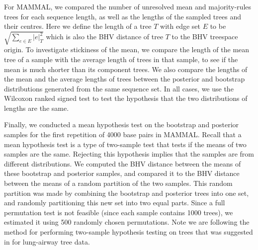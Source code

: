 \documentclass[12pt,letterpaper]{article}
\theoremstyle{plain}
\theoremstyle{definition}
\begin{document}
For MAMMAL, we compared the number of unresolved mean and majority-rules trees for each sequence length, as well as the lengths of the sampled trees and their centres.  Here we define the length of a tree $T$ with edge set $E$ to be $\sqrt{\sum_{e \in E} |e|_T^2}$ which is also the BHV distance of tree $T$ to the BHV treespace origin.  To investigate stickiness of the mean, we compare
the length of the mean tree of a sample with the average length of trees in that sample, to see if the mean is much shorter than its component trees.  We also compare the lengths of the mean and the average lengths of trees between the posterior and bootstrap distributions generated from the same sequence set.  In all cases, we use the Wilcoxon ranked signed test \citep{WilcoxonSignedRankTest} to test the hypothesis that the two distributions of lengths are the same.

Finally, we conducted a mean hypothesis test on the bootstrap and posterior samples for the first repetition of 4000 base pairs in MAMMAL.  Recall that a mean hypothesis test is a type of two-sample test that tests if the means of two samples are the same.  Rejecting this hypothesis implies that the samples are from different distributions.  We computed the BHV distance between the means of these bootstrap and posterior samples, and compared it to the BHV distance between the means of a random partition of the two samples.  This random partition was made by combining the bootstrap and posterior trees into one set, and randomly partitioning this new set into two equal parts.
Since a full permutation test is not feasible (since each sample contains 1000 trees), we estimated it using 500 randomly chosen permutations.  Note we are following the method for performing two-sample hypothesis testing on trees that was suggested in \citet{IPMI} for lung-airway tree data.
\end{document}
